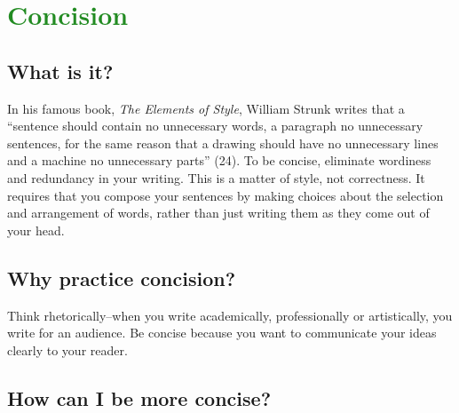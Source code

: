 \section{\textcolor{ForestGreen}{Concision}}
 
\subsection{What is it?}
 
In his famous book, \emph{The Elements of Style}, William Strunk writes that a ``sentence should contain no unnecessary words, a paragraph no unnecessary sentences, for the same reason that a drawing should have no unnecessary lines and a machine no unnecessary parts'' (24). To be concise, eliminate wordiness and redundancy in your writing. This is a matter of style, not correctness. It requires that you compose your sentences by making choices about the selection and arrangement of words, rather than just writing them as they come out of your head.
 
\subsection{Why practice concision?}
 
Think rhetorically--when you write academically, professionally or artistically, you write for an audience. Be concise because you want to communicate your ideas clearly to your reader.
 
\subsection{How can I be more concise?}
 

